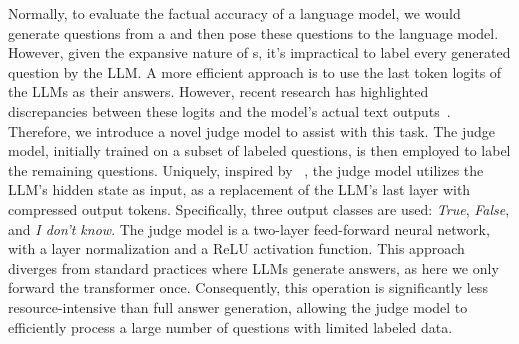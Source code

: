 \vspace{-2mm}
Normally, to evaluate the factual accuracy of a language model, we would generate questions from a  and then pose these questions to the language model. However, given the expansive nature of s, it's impractical to label every generated question by the LLM. 
A more efficient approach is to use the last token logits of the LLMs as their answers. However, %
recent research has highlighted discrepancies between these logits and the model's actual text outputs~\cite{wang2024myanswer}. 
Therefore, we introduce a novel judge model to assist with this task. The judge model, initially trained on a subset of labeled questions, is then employed to label the remaining questions. Uniquely, inspired by ~\cite{azaria-mitchell-2023-internal}, the judge model utilizes the LLM's hidden state as input, as a replacement of the LLM's last layer with compressed output tokens. Specifically, three output classes are used: \textit{True}, \textit{False}, and \textit{I don't know}. The judge model is a two-layer feed-forward neural network, with a layer normalization and a ReLU activation function. 
This approach diverges from standard practices where LLMs generate answers, as here we only forward the transformer once. Consequently, this operation is significantly less resource-intensive than full answer generation, allowing the judge model to efficiently process a large number of questions with limited labeled data.

\vspace{-2mm}
